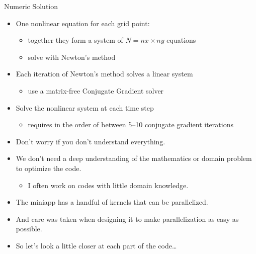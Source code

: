\documentclass[aspectratio=43]{beamer}
\begin{document}
\begin{frame}[fragile]{Numeric Solution}
    \begin{itemize}
        \item One nonlinear equation for each grid point:
        \begin{itemize}
            \item together they form a system of $N=nx \times ny$ equations
            \item solve with Newton's method
        \end{itemize}
        \item Each iteration of Newton's method solves a  linear system
        \begin{itemize}
            \item use a matrix-free Conjugate Gradient solver
        \end{itemize}
        \item Solve the nonlinear system at each time step
        \begin{itemize}
            \item requires in the order of between 5--10  conjugate  gradient iterations
        \end{itemize}
    \end{itemize}
\end{frame}

\begin{frame}[fragile]{}
    \begin{itemize}
        \item Don't worry if you don't understand everything.
            \item We don’t need a deep understanding of the  mathematics or domain problem to optimize the  code.
            \begin{itemize}
                \item I often work on codes with little domain knowledge.
            \end{itemize}
            \item The miniapp has a handful of kernels that can be  parallelized.
            \item And care was taken when designing it to make  parallelization as easy as possible.
            \item So let’s look a little closer at each part of the code\dots
    \end{itemize}
\end{frame}
\end{document}
